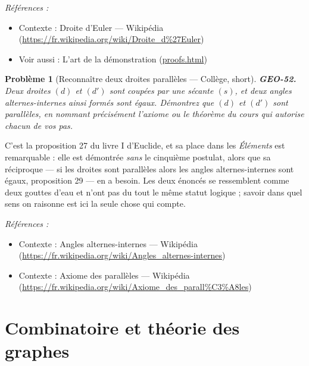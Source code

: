 \documentclass[11pt]{article}
\newtheorem{problem}{Problème}
\newenvironment{refs}{\par\small\noindent\emph{Références :}\begin{itemize}\setlength\itemsep{0pt}}{\end{itemize}\normalsize}
\begin{document}
\begin{refs}
\item Contexte : Droite d'Euler --- Wikipédia (\url{https://fr.wikipedia.org/wiki/Droite_d%27Euler})
\item Voir aussi : L'art de la démonstration (\url{proofs.html})
\end{refs}

\bigskip

\begin{problem}[{Reconnaître deux droites parallèles --- Collège, short}]
\textbf{GEO-52.} Deux droites $ (d) $ et $ (d') $ sont coupées par une
sécante $ (s) $, et deux angles alternes-internes ainsi formés sont égaux. Démontrez que $ (d) $
et $ (d') $ sont parallèles, en nommant précisément l'axiome ou le théorème du cours qui autorise
chacun de vos pas.
\end{problem}

\noindent C'est la proposition 27 du livre I d'Euclide, et sa place dans les \textit{Éléments}
est remarquable : elle est démontrée \textit{sans} le cinquième postulat, alors que sa réciproque --- si
les droites sont parallèles alors les angles alternes-internes sont égaux, proposition 29 --- en a
besoin. Les deux énoncés se ressemblent comme deux gouttes d'eau et n'ont pas du tout le même statut
logique ; savoir dans quel sens on raisonne est ici la seule chose qui compte.

\begin{refs}
\item Contexte : Angles alternes-internes --- Wikipédia (\url{https://fr.wikipedia.org/wiki/Angles_alternes-internes})
\item Contexte : Axiome des parallèles --- Wikipédia (\url{https://fr.wikipedia.org/wiki/Axiome_des_parall%C3%A8les})
\end{refs}

\bigskip


\section*{Combinatoire et théorie des graphes}
\end{document}
